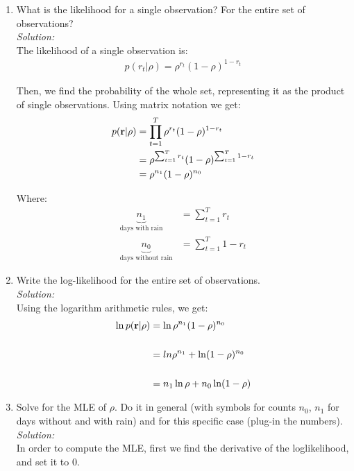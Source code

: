 \documentclass[12pt,a4paper]{article}
\newcommand{\rvec}{{\bf r}}
\begin{document}
\begin{enumerate}
  \item What is the likelihood for a single observation?  For the entire set of observations? \\
	  \emph{Solution:} \\
		  The likelihood of a single observation is: \\
		  \begin{align*}
		  p(r_t | \rho) = \rho^{r_t} (1 - \rho)^{1 - r_t}
		  \end{align*}
		  
		  Then, we find the probability of the whole set, representing it as the product of single observations. Using matrix notation we get: \\
		  
		  \begin{align*}
		  p(\rvec | \rho) &= \prod_{t = 1}^{T} \rho^{r_t} (1 - \rho)^{1 - r_t} \\
		  &= \rho^{\sum_{t = 1}^{T} r_t} (1 - \rho)^{\sum_{t = 1}^{T} 1 - r_t} \\
		  &= \rho^{n_1} (1 - \rho)^{n_0}
		  \end{align*}
		  
		  Where: \\
		  
		  \begin{align*}
		  \underbrace{n_1}_{\text{days with rain}} &= \sum_{t = 1}^{T} r_t \\ 
		  \underbrace{n_0}_{\text{days without rain}} &= \sum_{t = 1}^{T} 1 - r_t
		  \end{align*}
  
  \item Write the log-likelihood for the entire set of observations.  \\
	  \emph{Solution:} \\
		  Using the logarithm arithmetic rules, we get: \\
		  
		  \begin{align*}
		  \ln p(\rvec | \rho) &= \ln \rho^{n_1} (1 - \rho)^{n_0} \\ \\
		  &= ln \rho^{n_1} + \ln (1 - \rho)^{n_0} \\ \\
		  &= n_1 \ln \rho + n_0 \ln (1 - \rho)
		  \end{align*}
  
  \item Solve for the MLE of $\rho$.  Do it in general (with symbols for counts $n_0$, $n_1$ for days without and with rain) and for this specific case (plug-in the numbers).\\
	  \emph{Solution:} \\
		  In order to compute the MLE, first we find the derivative of the loglikelihood, and set it to $0$. \\
		  

\end{enumerate}
\end{document}
